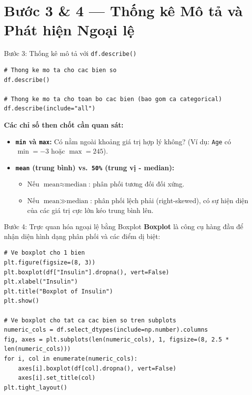 \documentclass[aspectratio=169,11pt]{beamer}
\newcommand{\code}[1]{\texttt{#1}}
\newcommand{\smallgap}{\vspace{0.35em}}
\begin{document}
\section{Bước 3 \& 4 — Thống kê Mô tả và Phát hiện Ngoại lệ}

\begin{frame}[fragile]{Bước 3: Thống kê mô tả với \texttt{df.describe()}}
\begin{lstlisting}[style=pythonstyle]
# Thong ke mo ta cho cac bien so
df.describe()

# Thong ke mo ta cho toan bo cac bien (bao gom ca categorical)
df.describe(include="all")
\end{lstlisting}

\smallgap
\textbf{Các chỉ số then chốt cần quan sát:}
\begin{itemize}
  \item \textbf{\code{min} và \code{max}:} Có nằm ngoài khoảng giá trị hợp lý không? (Ví dụ: \code{Age} có $\min = -3$ hoặc $\max = 245$).
  \item \textbf{\code{mean} (trung bình) vs.\ \code{50\%} (trung vị - median):}
  \begin{itemize}
    \item Nếu $\text{mean} \approx \text{median}$: phân phối tương đối đối xứng.
    \item Nếu $\text{mean} \gg \text{median}$: phân phối lệch phải (right-skewed), có sự hiện diện của các giá trị cực lớn kéo trung bình lên.
  \end{itemize}
\end{itemize}
\end{frame}

\begin{frame}[fragile]{Bước 4: Trực quan hóa ngoại lệ bằng Boxplot}
\textbf{Boxplot} là công cụ hàng đầu để nhận diện hình dạng phân phối và các điểm dị biệt:
\begin{lstlisting}[style=pythonstyle]
# Ve boxplot cho 1 bien
plt.figure(figsize=(8, 3))
plt.boxplot(df["Insulin"].dropna(), vert=False)
plt.xlabel("Insulin")
plt.title("Boxplot of Insulin")
plt.show()

# Ve boxplot cho tat ca cac bien so tren subplots
numeric_cols = df.select_dtypes(include=np.number).columns
fig, axes = plt.subplots(len(numeric_cols), 1, figsize=(8, 2.5 * len(numeric_cols)))
for i, col in enumerate(numeric_cols):
    axes[i].boxplot(df[col].dropna(), vert=False)
    axes[i].set_title(col)
plt.tight_layout()
\end{lstlisting}
\end{frame}
\end{document}
